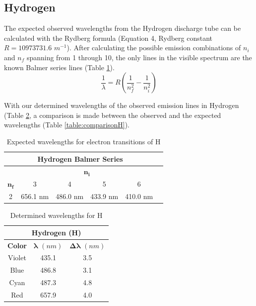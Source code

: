 \documentclass[a4paper, twocolumn]{article}
\begin{document}
\subsection{Hydrogen}
The expected observed wavelengths from the Hydrogen discharge tube can be calculated with the Rydberg formula (Equation 4, Rydberg constant $R = 10 973 731.6$ $m^{-1}$). 
After calculating the possible emission combinations of $n_i$ and $n_f$ spanning from 1 through 10, the only lines in the visible spectrum are the known Balmer series lines
(Table \ref{table:balmer}).
\begin{equation}
 \frac{1}{\lambda} = R(\frac{1}{n_f^2} - \frac{1}{n_i^2})
\end{equation}

With our determined wavelengths of the observed emission lines in Hydrogen (Table \ref{table:lambdaH}, a comparison is made between the observed and the expected
wavelengths (Table \ref{table:comparisonH}).
\begin{table}[h!]
\centering
\begin{tabular}{ |c|c|c|c|c|c| }
 \hline
 \multicolumn{5}{|c|}{\textbf{Hydrogen Balmer Series}} \\
 \hline
 \multicolumn{1}{|c|}{} & \multicolumn{4}{|c|}{$\boldsymbol{n_i}$} \\
 \hline
 $\boldsymbol{n_f}$ & 3 & 4 & 5 & 6 \\
 \hline
 2 & 656.1 nm & 486.0 nm & 433.9 nm & 410.0 nm \\
 \hline
\end{tabular}
\caption{Expected wavelengths for electron transitions of H}
\label{table:balmer}
\end{table}

\begin{table}[h!]
\centering
\begin{tabular}{ |c|c|c| }
 \hline
 \multicolumn{3}{|c|}{\textbf{Hydrogen (H)}} \\
 \hline
 \textbf{Color} & $\boldsymbol{\lambda}$ $(nm)$ & $\boldsymbol{\Delta\lambda}$ $(nm)$ \\
 \hline
 Violet & 435.1 & 3.5 \\
 \hline
 Blue & 486.8 & 3.1 \\
 \hline
 Cyan & 487.3 & 4.8 \\ 
 \hline
 Red & 657.9 & 4.0 \\
 \hline
\end{tabular}
\caption{Determined wavelengths for H}
\label{table:lambdaH}
\end{table}
\end{document}

